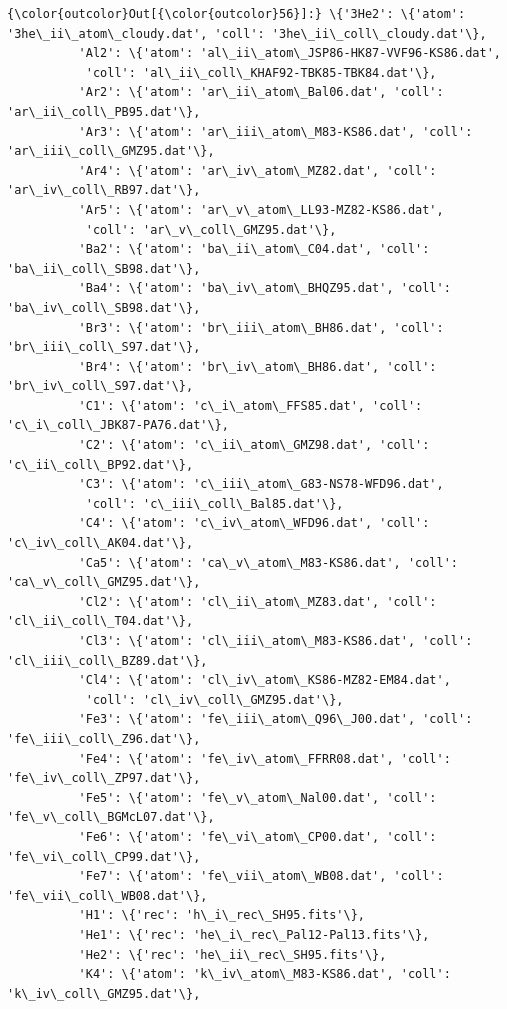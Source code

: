 \documentclass{report}
\begin{document}
            \begin{Verbatim}[commandchars=\\\{\}]
{\color{outcolor}Out[{\color{outcolor}56}]:} \{'3He2': \{'atom': '3he\_ii\_atom\_cloudy.dat', 'coll': '3he\_ii\_coll\_cloudy.dat'\},
          'Al2': \{'atom': 'al\_ii\_atom\_JSP86-HK87-VVF96-KS86.dat',
           'coll': 'al\_ii\_coll\_KHAF92-TBK85-TBK84.dat'\},
          'Ar2': \{'atom': 'ar\_ii\_atom\_Bal06.dat', 'coll': 'ar\_ii\_coll\_PB95.dat'\},
          'Ar3': \{'atom': 'ar\_iii\_atom\_M83-KS86.dat', 'coll': 'ar\_iii\_coll\_GMZ95.dat'\},
          'Ar4': \{'atom': 'ar\_iv\_atom\_MZ82.dat', 'coll': 'ar\_iv\_coll\_RB97.dat'\},
          'Ar5': \{'atom': 'ar\_v\_atom\_LL93-MZ82-KS86.dat',
           'coll': 'ar\_v\_coll\_GMZ95.dat'\},
          'Ba2': \{'atom': 'ba\_ii\_atom\_C04.dat', 'coll': 'ba\_ii\_coll\_SB98.dat'\},
          'Ba4': \{'atom': 'ba\_iv\_atom\_BHQZ95.dat', 'coll': 'ba\_iv\_coll\_SB98.dat'\},
          'Br3': \{'atom': 'br\_iii\_atom\_BH86.dat', 'coll': 'br\_iii\_coll\_S97.dat'\},
          'Br4': \{'atom': 'br\_iv\_atom\_BH86.dat', 'coll': 'br\_iv\_coll\_S97.dat'\},
          'C1': \{'atom': 'c\_i\_atom\_FFS85.dat', 'coll': 'c\_i\_coll\_JBK87-PA76.dat'\},
          'C2': \{'atom': 'c\_ii\_atom\_GMZ98.dat', 'coll': 'c\_ii\_coll\_BP92.dat'\},
          'C3': \{'atom': 'c\_iii\_atom\_G83-NS78-WFD96.dat',
           'coll': 'c\_iii\_coll\_Bal85.dat'\},
          'C4': \{'atom': 'c\_iv\_atom\_WFD96.dat', 'coll': 'c\_iv\_coll\_AK04.dat'\},
          'Ca5': \{'atom': 'ca\_v\_atom\_M83-KS86.dat', 'coll': 'ca\_v\_coll\_GMZ95.dat'\},
          'Cl2': \{'atom': 'cl\_ii\_atom\_MZ83.dat', 'coll': 'cl\_ii\_coll\_T04.dat'\},
          'Cl3': \{'atom': 'cl\_iii\_atom\_M83-KS86.dat', 'coll': 'cl\_iii\_coll\_BZ89.dat'\},
          'Cl4': \{'atom': 'cl\_iv\_atom\_KS86-MZ82-EM84.dat',
           'coll': 'cl\_iv\_coll\_GMZ95.dat'\},
          'Fe3': \{'atom': 'fe\_iii\_atom\_Q96\_J00.dat', 'coll': 'fe\_iii\_coll\_Z96.dat'\},
          'Fe4': \{'atom': 'fe\_iv\_atom\_FFRR08.dat', 'coll': 'fe\_iv\_coll\_ZP97.dat'\},
          'Fe5': \{'atom': 'fe\_v\_atom\_Nal00.dat', 'coll': 'fe\_v\_coll\_BGMcL07.dat'\},
          'Fe6': \{'atom': 'fe\_vi\_atom\_CP00.dat', 'coll': 'fe\_vi\_coll\_CP99.dat'\},
          'Fe7': \{'atom': 'fe\_vii\_atom\_WB08.dat', 'coll': 'fe\_vii\_coll\_WB08.dat'\},
          'H1': \{'rec': 'h\_i\_rec\_SH95.fits'\},
          'He1': \{'rec': 'he\_i\_rec\_Pal12-Pal13.fits'\},
          'He2': \{'rec': 'he\_ii\_rec\_SH95.fits'\},
          'K4': \{'atom': 'k\_iv\_atom\_M83-KS86.dat', 'coll': 'k\_iv\_coll\_GMZ95.dat'\},

\end{Verbatim}
\end{document}
